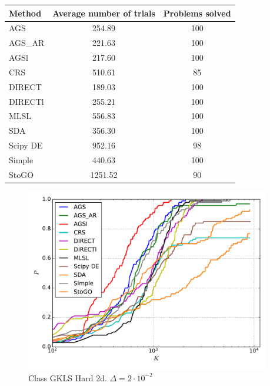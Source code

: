 \documentclass[a4paper]{article}
\begin{document}
\begin{tabular}{lcc}
\hline
 Method   &  Average number of trials  &  Problems solved  \\
\hline
 AGS      &           254.89           &        100        \\
 AGS\_AR   &           221.63           &        100        \\
 AGSl     &           217.60           &        100        \\
 CRS      &           510.61           &        85         \\
 DIRECT   &           189.03           &        100        \\
 DIRECTl  &           255.21           &        100        \\
 MLSL     &           556.83           &        100        \\
 SDA      &           356.30           &        100        \\
 Scipy DE &           952.16           &        98         \\
 Simple   &           440.63           &        100        \\
 StoGO    &          1251.52           &        90         \\
\hline
\end{tabular}
\begin{figure}[H]
  \center
  \includegraphics[width=0.95\textwidth]{../experiments/gklsh2d/cmc.pdf}
  \caption{Class GKLS Hard 2d. $\Delta=2\cdot10^{-2}$}
\end{figure}
\end{document}
